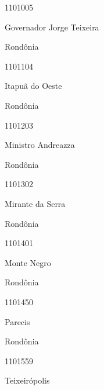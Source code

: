 \documentclass[
  letterpaper,
]{report}
\begin{document}
\n      

1101005

\n      

Governador Jorge Teixeira

\n    

\n    

\n      

Rondônia

\n      

1101104

\n      

Itapuã do Oeste

\n    

\n    

\n      

Rondônia

\n      

1101203

\n      

Ministro Andreazza

\n    

\n    

\n      

Rondônia

\n      

1101302

\n      

Mirante da Serra

\n    

\n    

\n      

Rondônia

\n      

1101401

\n      

Monte Negro

\n    

\n    

\n      

Rondônia

\n      

1101450

\n      

Parecis

\n    

\n    

\n      

Rondônia

\n      

1101559

\n      

Teixeirópolis
\end{document}
